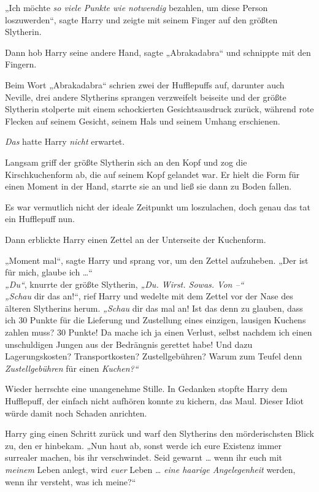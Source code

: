 {„Ich möchte \emph{so viele Punkte wie notwendig} bezahlen, um diese Person loszuwerden“, sagte Harry und zeigte mit seinem Finger auf den größten Slytherin.

Dann hob Harry seine andere Hand, sagte „Abrakadabra“ und schnippte mit den Fingern.

Beim Wort „Abrakadabra“ schrien zwei der Hufflepuffs auf, darunter auch Neville, drei andere Slytherins sprangen verzweifelt beiseite und der größte Slytherin stolperte mit einem schockierten Gesichtsausdruck zurück, während rote Flecken auf seinem Gesicht, seinem Hals und seinem Umhang erschienen.

\emph{Das} hatte Harry \emph{nicht} erwartet.

Langsam griff der größte Slytherin sich an den Kopf und zog die Kirschkuchenform ab, die auf seinem Kopf gelandet war. Er hielt die Form für einen Moment in der Hand, starrte sie an und ließ sie dann zu Boden fallen.

Es war vermutlich nicht der ideale Zeitpunkt um loszulachen, doch genau das tat ein Hufflepuff nun.

Dann erblickte Harry einen Zettel an der Unterseite der Kuchenform.

„Moment mal“, sagte Harry und sprang vor, um den Zettel aufzuheben. „Der ist für mich, glaube ich …“\\ \emph{„Du“}, knurrte der größte Slytherin, \emph{„Du. Wirst. Sowas. Von --“}\\ \emph{„Schau} dir das an!“, rief Harry und wedelte mit dem Zettel vor der Nase des älteren Slytherins herum. \emph{„Schau} dir das mal an! Ist das denn zu glauben, dass ich 30 Punkte für die Lieferung und Zustellung eines einzigen, lausigen Kuchens zahlen muss? 30 Punkte! Da mache ich ja einen Verlust, selbst nachdem ich einen unschuldigen Jungen aus der Bedrängnis gerettet habe! Und dazu Lagerungskosten? Transportkosten? Zustellgebühren? Warum zum Teufel denn \emph{Zustellgebühren} für einen \emph{Kuchen?“}

Wieder herrschte eine unangenehme Stille. In Gedanken stopfte Harry dem Hufflepuff, der einfach nicht aufhören konnte zu kichern, das Maul. Dieser Idiot würde damit noch Schaden anrichten.

Harry ging einen Schritt zurück und warf den Slytherins den mörderischsten Blick zu, den er hinbekam. „Nun haut ab, sonst werde ich eure Existenz immer surrealer machen, bis ihr verschwindet. Seid gewarnt … wenn ihr euch mit \emph{meinem} Leben anlegt, wird \emph{euer} Leben … \emph{eine haarige Angelegenheit} werden, wenn ihr versteht, was ich meine?“

}
